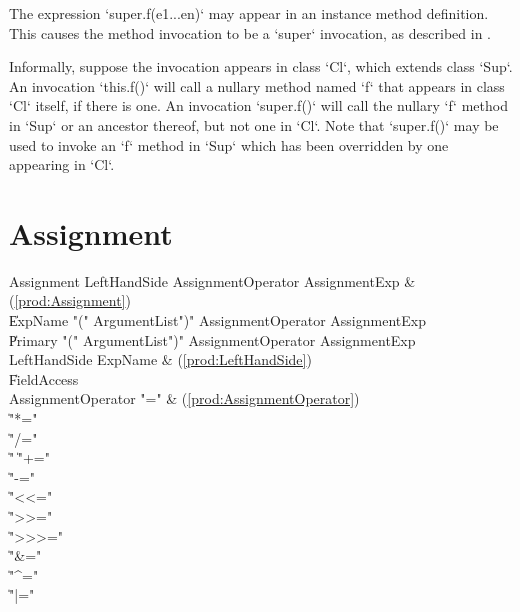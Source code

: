 The expression \xcd`super.f(e1...en)` may appear in an instance method
definition.   This causes the method invocation to be a \xcd`super`
invocation, as described in .  

Informally, suppose the invocation appears in class \xcd`Cl`, which extends
class \xcd`Sup`. An invocation \xcd`this.f()` will call a nullary method named
\xcd`f` that appears in class \xcd`Cl` itself, if there is one.  An invocation
\xcd`super.f()` will call the nullary  \xcd`f` method in \xcd`Sup` or an
ancestor thereof, but not one in \xcd`Cl`.  Note that \xcd`super.f()` may be
used to invoke an \xcd`f` method in \xcd`Sup` which has been overridden by one
appearing in \xcd`Cl`.  


\section{Assignment}\label{AssignmentStatement}

\begin{bbgrammar}
          Assignment \: LeftHandSide AssignmentOperator AssignmentExp & (\ref{prod:Assignment}) \\
                    \| ExpName  \xcd"(" ArgumentList\opt \xcd")" AssignmentOperator AssignmentExp \\
                    \| Primary  \xcd"(" ArgumentList\opt \xcd")" AssignmentOperator AssignmentExp \\
        LeftHandSide \: ExpName & (\ref{prod:LeftHandSide}) \\
                    \| FieldAccess \\
  AssignmentOperator \: \xcd"=" & (\ref{prod:AssignmentOperator}) \\
                    \| \xcd"*=" \\
                    \| \xcd"/=" \\
                    \| \xcd"%
                    \| \xcd"+=" \\
                    \| \xcd"-=" \\
                    \| \xcd"<<=" \\
                    \| \xcd">>=" \\
                    \| \xcd">>>=" \\
                    \| \xcd"&=" \\
                    \| \xcd"^=" \\
                    \| \xcd"|=" \\
\end{bbgrammar}



